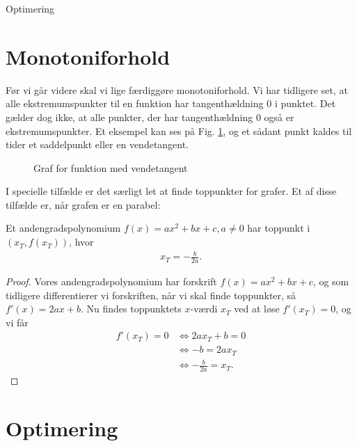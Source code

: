
\begin{center}
\Huge
Optimering
\end{center}
\section*{Monotoniforhold}
Før vi går videre skal vi lige færdiggøre monotoniforhold. Vi har tidligere set, at alle ekstremumspunkter til en funktion har tangenthældning $0$ i punktet. Det gælder dog ikke, at alle punkter, der har tangenthældning $0$ også er ekstremumspunkter. Et eksempel kan ses på Fig. \ref{fig:vendetangent}, og et sådant punkt kaldes til tider et saddelpunkt eller en vendetangent.
\begin{figure}[H]
\centering
{}
\caption{Graf for funktion med vendetangent}
\label{fig:vendetangent}
\end{figure}

I specielle tilfælde er det særligt let at finde toppunkter for grafer. Et af disse tilfælde er, når grafen er en parabel:
\begin{setn}
Et andengradspolynomium $f(x) = ax^2+bx+c, a\neq 0$ har toppunkt i $(x_T,f(x_T))$, hvor 
\begin{align*}
x_T = -\frac{b}{2a}.
\end{align*}
\end{setn}
\begin{proof}
Vores andengradspolynomium har forskrift $f(x) = ax^2+bx+c$, og som tidligere differentierer vi forskriften, når vi skal finde toppunkter, så $f'(x) = 2ax+b.$ Nu findes toppunktets $x$-værdi $x_T$ ved at løse $f'(x_T) = 0$, og vi får
\begin{align*}
f'(x_T) = 0 &\Leftrightarrow 2ax_T+b = 0 \\
&\Leftrightarrow -b = 2ax_T\\
&\Leftrightarrow -\frac{b}{2a} = x_T.
\end{align*}  
\end{proof}
\section*{Optimering}

